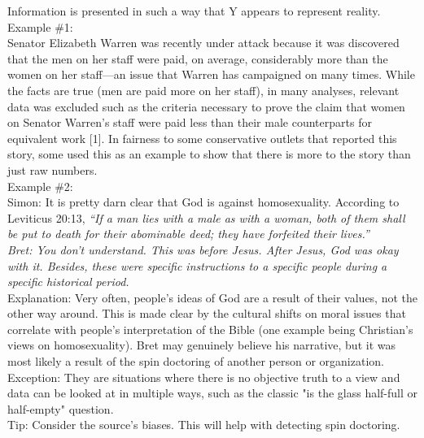 \documentclass[a4paper,12pt,single,pdftex]{scrartcl}
\begin{document}
    
      Information is presented in such a way that Y appears to represent reality.
    \\

    
      Example \#1:
    \\

    
      Senator Elizabeth Warren was recently under attack because it was discovered that the men on her staff were paid, on average, considerably more than the women on her staff—an issue that Warren has campaigned on many times. While the facts are true (men are paid more on her staff), in many analyses, relevant data was excluded such as the criteria necessary to prove the claim that women on Senator Warren's staff were paid less than their male counterparts for equivalent work [1]. In fairness to some conservative outlets that reported this story, some used this as an example to show that there is more to the story than just raw numbers.
    \\

    
      Example \#2:
    \\

    
      Simon: It is pretty darn clear that God is against homosexuality. According to Leviticus 20:13, {\it “If a man lies with a male as with a woman, both of them shall be put to death for their abominable deed; they have forfeited their lives.”}
    \\

    
      {\it Bret: You don't understand. This was before Jesus. After Jesus, God was okay with it. Besides, these were specific instructions to a specific people during a specific historical period.}
    \\

    
      Explanation: Very often, people's ideas of God are a result of their values, not the other way around. This is made clear by the cultural shifts on moral issues that correlate with people's interpretation of the Bible (one example being Christian's views on homosexuality). Bret may genuinely believe his narrative, but it was most likely a result of the spin doctoring of another person or organization.
    \\

    
      Exception: They are situations where there is no objective truth to a view and data can be looked at in multiple ways, such as the classic "is the glass half-full or half-empty" question.
    \\

    
      Tip: Consider the source's biases. This will help with detecting spin doctoring.
    \\
\end{document}
